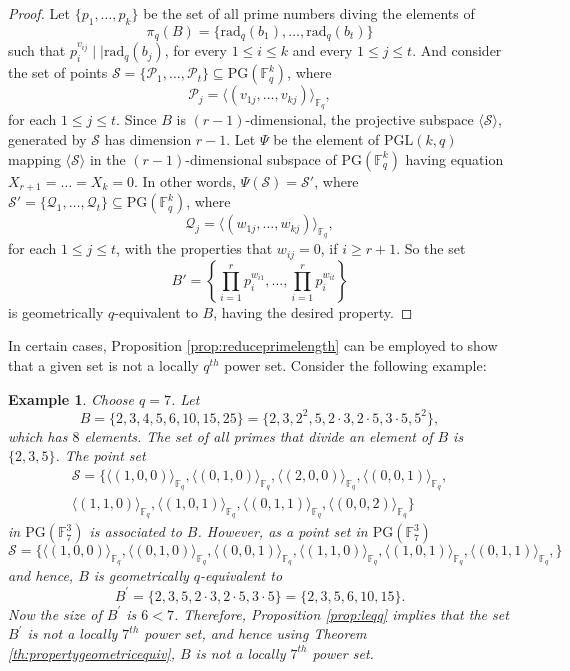 \documentclass[12pt]{amsart}
\newtheorem{example}[theorem]{Example}
\newcommand{\F}{{\mathbb F}}
\newcommand{\PG}{\mathrm{PG}}
\newcommand{\rad}{\mathrm{rad}_q}
\begin{document}
\begin{proof}
Let $ \{p_1,\ldots,p_k\}$ be the set of all prime numbers diving the elements of \[\pi_q(B)=\{ 
    \rad( b_1 ),\ldots,\rad( b_t )
    \} \] such that $p_i^{v_{ij}} \mid \mid \rad( b_j )$, for every $1\leq i \leq k$ and every $1 \leq j \leq t$. 
 And consider the set of points $\mathcal{S}=\{\mathcal{P}_1,\ldots,\mathcal{P}_t\} \subseteq \PG(\F_{q}^{k})$, where 
        \[
        \mathcal{P}_j=\langle (v_{1j},\ldots,v_{kj}) \rangle_{\F_q}
        ,\]
        for each $1 \leq j \leq t$. Since $B$ is $(r-1)$-dimensional, the projective subspace $\langle \mathcal{S} \rangle$, generated by $\mathcal{S}$ has dimension $r-1$. Let $\Psi$ be the element of $\mathrm{PGL}(k,q)$ mapping $\langle \mathcal{S} \rangle$ in the $(r-1)$-dimensional subspace of $\PG(\F_{q}^{k})$ having equation $X_{r+1}=\ldots=X_k=0$. In other words, $\Psi(\mathcal{S})=\mathcal{S}'$, where $\mathcal{S}'=\{\mathcal{Q}_1,\ldots,\mathcal{Q}_t\} \subseteq \PG(\F_{q}^{k})$, where 
        \[
        \mathcal{Q}_j=\langle (w_{1j},\ldots,w_{kj}) \rangle_{\F_q}
        ,\]
        for each $1 \leq j \leq t$, with the properties that $w_{ij}=0$, if $i \geq r+1$. So the set \[
        B'=\left\{\prod_{i=1}^{r}p_i^{w_{i1}},\ldots,\prod_{i=1}^{r}p_i^{w_{it}}\right\}
        \]
        is geometrically $q$-equivalent to $B$, having the desired property.
\end{proof}

In certain cases, Proposition \ref{prop:reduceprimelength} can be employed to show that a given set is not a locally $q^{th}$ power set. Consider the following example: 
\begin{example}
    Choose $q=7$. Let \[B=\{2,3,4,5,6,10,15,25\}=\{2,3,2^2,5,2\cdot 3,2 \cdot 5,3 \cdot 5, 5^2\},\] which has $8$ elements. The set of all primes that divide an element of $B$ is $\{2, 3,5\}$. The point set
    \begin{multline*}
         \mathcal{S} = \Big\{\langle (1,0,0) \rangle_{\F_q},\langle (0,1,0) \rangle_{\F_q},\langle (2,0,0) \rangle_{\F_q},\langle (0,0,1) \rangle_{\F_q}, \\ \langle (1,1,0) \rangle_{\F_q},\langle (1,0,1) \rangle_{\F_q},\langle (0,1,1) \rangle_{\F_q},\langle (0,0,2) \rangle_{\F_q}\Big\}
    \end{multline*}
    in $\PG(\F_{7}^{3})$ is associated to $B$. However, as a point set in $\PG(\F_{7}^{3})$
    \[
    \mathcal{S} = \{\langle (1,0,0) \rangle_{\F_q},\langle (0,1,0) \rangle_{\F_q},\langle (0,0,1) \rangle_{\F_q},\langle (1,1,0) \rangle_{\F_q},\langle (1,0,1) \rangle_{\F_q},\langle (0,1,1) \rangle_{\F_q},\} 
    \]
    and hence, $B$ is geometrically $q$-equivalent to 
    \[B^{\prime} = \{2,3,5,2\cdot 3,2 \cdot 5,3 \cdot 5\}=\{2,3,5,6,10,15\}.\]
    Now the size of $B^{\prime}$ is $6 < 7$. Therefore, Proposition \ref{prop:leqq} implies that the set $B^{\prime}$ is not a locally $7^{th}$ power set, and hence using Theorem \ref{th:propertygeometricequiv}, $B$ is not a locally $7^{th}$ power set. 
\end{example}
\end{document}
